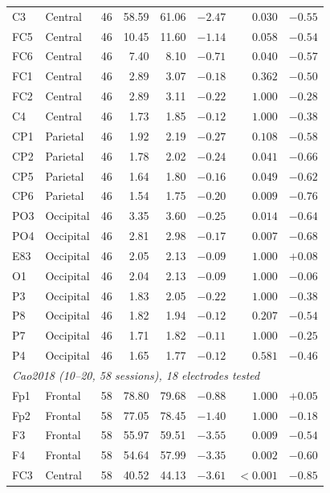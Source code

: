 \begin{longtable}{llrrrrrr}
C3 & Central & 46 & 58.59 & 61.06 & $-2.47$ & $\mathbf{0.030}$ & $-0.55$ \\
FC5 & Central & 46 & 10.45 & 11.60 & $-1.14$ & $0.058$ & $-0.54$ \\
FC6 & Central & 46 & 7.40 & 8.10 & $-0.71$ & $\mathbf{0.040}$ & $-0.57$ \\
FC1 & Central & 46 & 2.89 & 3.07 & $-0.18$ & $0.362$ & $-0.50$ \\
FC2 & Central & 46 & 2.89 & 3.11 & $-0.22$ & $1.000$ & $-0.28$ \\
C4 & Central & 46 & 1.73 & 1.85 & $-0.12$ & $1.000$ & $-0.38$ \\
CP1 & Parietal & 46 & 1.92 & 2.19 & $-0.27$ & $0.108$ & $-0.58$ \\
CP2 & Parietal & 46 & 1.78 & 2.02 & $-0.24$ & $\mathbf{0.041}$ & $-0.66$ \\
CP5 & Parietal & 46 & 1.64 & 1.80 & $-0.16$ & $\mathbf{0.049}$ & $-0.62$ \\
CP6 & Parietal & 46 & 1.54 & 1.75 & $-0.20$ & $\mathbf{0.009}$ & $-0.76$ \\
PO3 & Occipital & 46 & 3.35 & 3.60 & $-0.25$ & $\mathbf{0.014}$ & $-0.64$ \\
PO4 & Occipital & 46 & 2.81 & 2.98 & $-0.17$ & $\mathbf{0.007}$ & $-0.68$ \\
E83 & Occipital & 46 & 2.05 & 2.13 & $-0.09$ & $1.000$ & $+0.08$ \\
O1 & Occipital & 46 & 2.04 & 2.13 & $-0.09$ & $1.000$ & $-0.06$ \\
P3 & Occipital & 46 & 1.83 & 2.05 & $-0.22$ & $1.000$ & $-0.38$ \\
P8 & Occipital & 46 & 1.82 & 1.94 & $-0.12$ & $0.207$ & $-0.54$ \\
P7 & Occipital & 46 & 1.71 & 1.82 & $-0.11$ & $1.000$ & $-0.25$ \\
P4 & Occipital & 46 & 1.65 & 1.77 & $-0.12$ & $0.581$ & $-0.46$ \\
\midrule
\multicolumn{8}{l}{\textit{Cao2018 (10--20, 58 sessions), 18 electrodes tested}} \\[2pt]
Fp1 & Frontal & 58 & 78.80 & 79.68 & $-0.88$ & $1.000$ & $+0.05$ \\
Fp2 & Frontal & 58 & 77.05 & 78.45 & $-1.40$ & $1.000$ & $-0.18$ \\
F3 & Frontal & 58 & 55.97 & 59.51 & $-3.55$ & $\mathbf{0.009}$ & $-0.54$ \\
F4 & Frontal & 58 & 54.64 & 57.99 & $-3.35$ & $\mathbf{0.002}$ & $-0.60$ \\
FC3 & Central & 58 & 40.52 & 44.13 & $-3.61$ & $\mathbf{<0.001}$ & $-0.85$ \\

\end{longtable}
